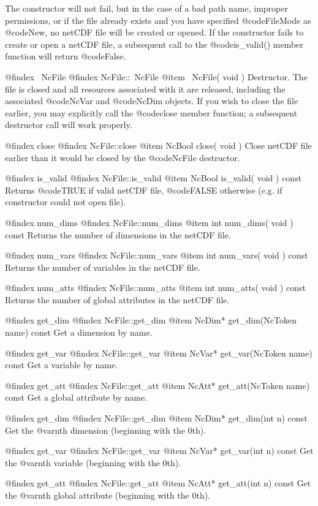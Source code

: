 The constructor will not fail, but in the case of a bad path name,
improper permissions, or if the file already exists and you have
specified @code{FileMode} as @code{New}, no netCDF file will be created
or opened.  If the constructor fails to create or open a netCDF file, a
subsequent call to the @code{is_valid()} member function will return
@code{False}.

@findex ~NcFile
@findex NcFile::~NcFile
@item ~NcFile( void )
Destructor.  The file is closed and all resources associated with it are
released, including the associated @code{NcVar} and @code{NcDim}
objects.  If you wish to close the file earlier, you may explicitly call
the @code{close} member function; a subsequent destructor call will work
properly.

@findex close
@findex NcFile::close
@item NcBool close( void )
Close netCDF file earlier than it would be closed by the @code{NcFile}
destructor.

@findex is_valid
@findex NcFile::is_valid
@item NcBool is_valid( void ) const
Returns @code{TRUE} if valid netCDF file, @code{FALSE} otherwise (e.g.
if constructor could not open file).

@findex num_dims
@findex NcFile::num_dims
@item int num_dims( void ) const
Returns the number of dimensions in the netCDF file.

@findex num_vars
@findex NcFile::num_vars
@item int num_vars( void ) const
Returns the number of variables in the netCDF file.

@findex num_atts
@findex NcFile::num_atts
@item int num_atts( void ) const
Returns the number of global attributes in the netCDF file.

@findex get_dim
@findex NcFile::get_dim
@item NcDim* get_dim(NcToken name) const
Get a dimension by name.

@findex get_var
@findex NcFile::get_var
@item NcVar* get_var(NcToken name) const
Get a variable by name.

@findex get_att
@findex NcFile::get_att
@item NcAtt* get_att(NcToken name) const
Get a global attribute by name.

@findex get_dim
@findex NcFile::get_dim
@item NcDim* get_dim(int n) const
Get the @var{n}th dimension (beginning with the 0th).

@findex get_var
@findex NcFile::get_var
@item NcVar* get_var(int n) const
Get the @var{n}th variable (beginning with the 0th).

@findex get_att
@findex NcFile::get_att
@item NcAtt* get_att(int n) const
Get the @var{n}th global attribute (beginning with the 0th).


